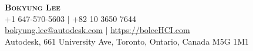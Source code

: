 \documentclass[letterpaper,11pt]{article} %
\begin{document}
\begin{comment}
In Europe it is common to include a picture of ones self in the CV. Select which heading appropriate for the document you are creating.
\end{comment}


\begin{center}
    \textbf{\Huge \scshape Bokyung Lee} \\ \vspace{1pt} %
    \small +1 647-570-5603 $|$ +82 10 3650 7644 \\
    \href{mailto:bokyung.lee@autodesk.com}{bokyung.lee@autodesk.com} $|$    \href{https://boleeHCI.com}{https://boleeHCI.com} \\
    \small Autodesk, 661 University Ave, Toronto, Ontario, Canada M5G 1M1
\end{center}
\end{document}
